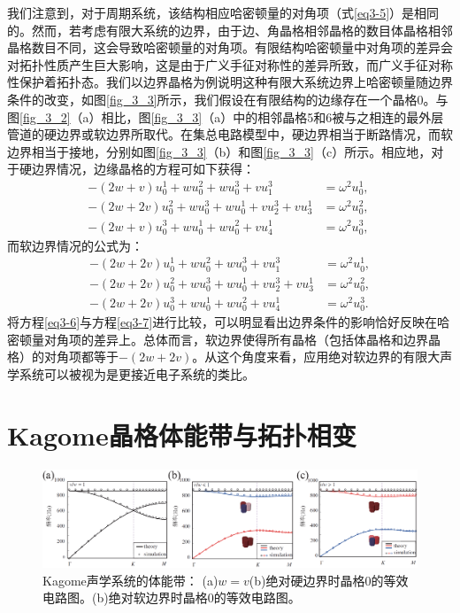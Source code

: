 我们注意到，对于周期系统，该结构相应哈密顿量的对角项（式\ref{eq3-5}）是相同的。然而，若考虑有限大系统的边界，由于边、角晶格相邻晶格的数目体晶格相邻晶格数目不同，这会导致哈密顿量的对角项。有限结构哈密顿量中对角项的差异会对拓扑性质产生巨大影响，这是由于广义手征对称性的差异所致，而广义手征对称性保护着拓扑态。我们以边界晶格为例说明这种有限大系统边界上哈密顿量随边界条件的改变，如图\ref{fig_3_3}所示，我们假设在有限结构的边缘存在一个晶格0。与图\ref{fig_3_2}（a）相比，图\ref{fig_3_3}（a）中的相邻晶格5和6被与之相连的最外层管道的硬边界或软边界所取代。在集总电路模型中，硬边界相当于断路情况，而软边界相当于接地，分别如图\ref{fig_3_3}（b）和图\ref{fig_3_3}（c）所示。相应地，对于硬边界情况，边缘晶格的方程可如下获得：
\begin{subequations}\label{eq3-6}
  \begin{align}
  -(2w + v)u_{0}^{1} + wu_{0}^{2} + wu_{0}^{3} + vu_{1}^{3} &= \omega^{2}u_{0}^{1}, \\
  -(2w + 2v)u_{0}^{2} + wu_{0}^{3} + wu_{0}^{1} + vu_{2}^{3} + vu_{3}^{1} &= \omega^{2}u_{0}^{2}, \\
  -(2w + v)u_{0}^{3} + wu_{0}^{1} + wu_{0}^{2} + vu_{4}^{1} &= \omega^{2}u_{0}^{3}, \
  \end{align}
\end{subequations}
而软边界情况的公式为：
\begin{subequations}\label{eq3-7}
  \begin{align}
  -(2w + 2v)u_{0}^{1} + wu_{0}^{2} + wu_{0}^{3} + vu_{1}^{3} &= \omega^{2}u_{0}^{1}, \\
  -(2w + 2v)u_{0}^{2} + wu_{0}^{3} + wu_{0}^{1} + vu_{2}^{3} + vu_{3}^{1} &= \omega^{2}u_{0}^{2}, \\
  -(2w + 2v)u_{0}^{3} + wu_{0}^{1} + wu_{0}^{2} + vu_{4}^{1} &= \omega^{2}u_{0}^{3}. 
  \end{align}
\end{subequations}
将方程\ref{eq3-6}与方程\ref{eq3-7}进行比较，可以明显看出边界条件的影响恰好反映在哈密顿量对角项的差异上。总体而言，软边界使得所有晶格（包括体晶格和边界晶格）的对角项都等于$-(2w + 2v)$。从这个角度来看，应用绝对软边界的有限大声学系统可以被视为是更接近电子系统的类比。

\section{Kagome晶格体能带与拓扑相变}

\begin{figure}[h!]
  \centering
  \includegraphics[width=1\textwidth]{images/fig3-4.eps} 
  \caption{Kagome声学系统的体能带：
  (a)$w=v$(b)绝对硬边界时晶格0的等效电路图。(b)绝对软边界时晶格0的等效电路图。
  }
  \label{fig_3_4}
\end{figure}

